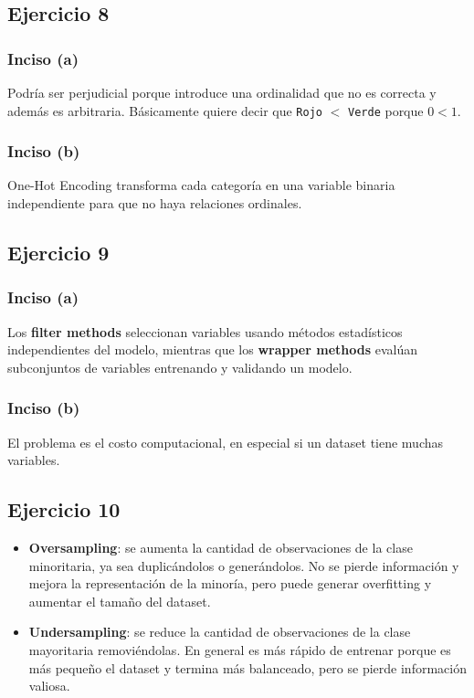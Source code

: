 \documentclass[a4paper,12pt]{article}
\begin{document}
        \subsection*{Ejercicio 8}
            \subsubsection*{Inciso (a)}
                \noindent Podría ser perjudicial porque introduce una ordinalidad que no es correcta y además es arbitraria. Básicamente quiere decir que \texttt{Rojo} $<$ \texttt{Verde} porque $0 < 1$.
            \subsubsection*{Inciso (b)}
                \noindent One-Hot Encoding transforma cada categoría en una variable binaria independiente para que no haya relaciones ordinales.
        \subsection*{Ejercicio 9}
            \subsubsection*{Inciso (a)}
                \noindent Los \textbf{filter methods} seleccionan variables usando métodos estadísticos independientes del modelo, mientras que los \textbf{wrapper methods} evalúan subconjuntos de variables entrenando y validando un modelo.
            \subsubsection*{Inciso (b)}
                \noindent El problema es el costo computacional, en especial si un dataset tiene muchas variables.
        \subsection*{Ejercicio 10}
            \begin{itemize}
                \item \textbf{Oversampling}: se aumenta la cantidad de observaciones de la clase minoritaria, ya sea duplicándolos o generándolos. No se pierde información y mejora la representación de la minoría, pero puede generar overfitting y aumentar el tamaño del dataset.
                \item \textbf{Undersampling}: se reduce la cantidad de observaciones de la clase mayoritaria removiéndolas. En general es más rápido de entrenar porque es más pequeño el dataset y termina más balanceado, pero se pierde información valiosa.
            \end{itemize}
\end{document}

